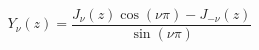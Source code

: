 \documentclass[12pt]{article}
\begin{document}
\begin{displaymath}
Y_\nu(z) = \frac{J_\nu(z)\cos(\nu\pi) - J_{-\nu}(z)}{\sin(\nu\pi)}
\end{displaymath}
\end{document}
